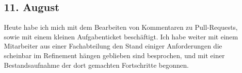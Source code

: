 \subsection{11. August}
Heute habe ich mich mit dem Bearbeiten von Kommentaren zu Pull-Requests, sowie mit einem kleinen Aufgabenticket beschäftigt. Ich habe weiter mit einem Mitarbeiter aus einer Fachabteilung den Stand einiger Anforderungen die scheinbar im Refinement hängen geblieben sind besprochen, und mit einer Bestandsaufnahme der dort gemachten Fortschritte begonnen.
